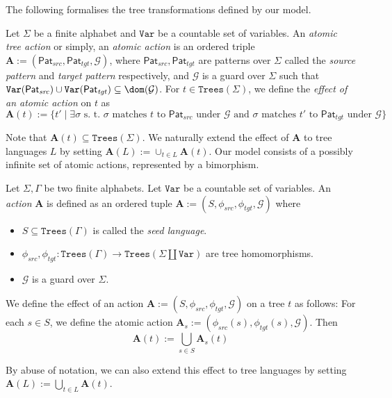 \documentclass[12pt, a4paper]{article}
\newcommand{\Alphabet}{\ensuremath{\Sigma}}
\newcommand{\Variables}{\texttt{Var}}
\newcommand{\Trees}[1]{\ensuremath{\texttt{Trees}\left(#1\right)}}
\newcommand{\substitution}{\ensuremath{\sigma}}
\newcommand{\pattern}{\mathsf{Pat}}
\newcommand{\action}{\ensuremath{\mathbf{A}}}
\newcommand{\guardFunction}{\ensuremath{\mathcal{G}}}
\newcommand{\seedLang}{S}
\newcommand{\src}{\mathit{src}}
\newcommand{\sourcePattern}{\pattern_\src}
\newcommand{\sourceMap}{\ensuremath{\phi_{\src}}}
\newcommand{\tgt}{\mathit{tgt}}
\newcommand{\targetPattern}{\pattern_\tgt}
\newcommand{\targetMap}{\ensuremath{\phi_{\tgt}}}
\begin{document}
The following formalises the tree transformations defined by our model.
\begin{definition}\label{def:atomicAction}
    Let $\Alphabet$ be a finite alphabet and $\Variables$ be a countable set of variables. An \emph{atomic tree action} or simply, an \emph{atomic action} is an ordered triple $\action := (\sourcePattern, \targetPattern, \guardFunction)$, where $\sourcePattern, \targetPattern$ are patterns over $\Alphabet$ called the \emph{source pattern} and \emph{target pattern} respectively, and $\guardFunction$ is a guard over $\Alphabet$ such that $\Variables(\sourcePattern) \cup \Variables(\targetPattern) \subseteq \dom(\guardFunction)$. For $t \in \Trees{\Alphabet}$, we define the \emph{effect of an atomic action} on $t$ as
    \[ \action(t) := \{t' \mid \exists \substitution \mbox{ s. t. } \substitution \mbox{ matches } t  \mbox{ to } \sourcePattern \mbox{ under } \guardFunction \mbox{ and } \substitution \mbox{ matches } t'  \mbox{ to } \targetPattern \mbox{ under } \guardFunction   \} \]
\end{definition}
Note that $\action(t) \subseteq \Trees{\Alphabet}$. We naturally extend the effect of $\action$ to tree languages $L$ by setting $\action(L) := \cup_{t \in L}\action (t)$. Our model consists of a possibly infinite set of atomic actions, represented by a bimorphism.

\begin{definition}[Action]\label{def:action}
    Let $\Alphabet, \Gamma$ be two finite alphabets. Let $\Variables$ be a countable set of variables. An \emph{action} $\action$ is defined as an ordered tuple $\action := (\seedLang, \sourceMap, \targetMap, \guardFunction)$ where
    \begin{itemize}
        \item $\seedLang \subseteq \Trees{\Gamma}$ is called the \emph{seed language}.
        \item $\sourceMap, \targetMap : \Trees{\Gamma} \to \Trees{\Alphabet \coprod \Variables}$ are tree homomorphisms.
        \item $\guardFunction$ is a guard over $\Alphabet$.
    \end{itemize}
    We define the effect of an action $\action := (\seedLang, \sourceMap, \targetMap, \guardFunction)$ on a tree $t$ as follows: For each $s \in \seedLang$, we define the atomic action $\action_s := (\sourceMap(s), \targetMap(s), \guardFunction)$. Then
    \[ \action(t) := \bigcup_{s \in \seedLang}\action_s(t) \]
\end{definition}
By abuse of notation, we can also extend this effect to tree languages by setting $\action(L) := \bigcup_{t \in L}\action(t)$.
\end{document}
